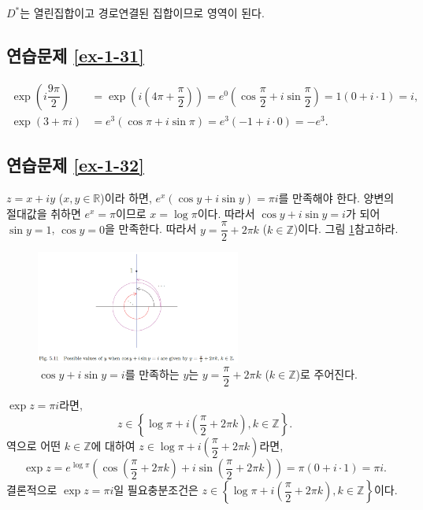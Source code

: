 $D^*$는 열린집합이고 경로연결된 집합이므로 영역이 된다.

\subsection*{연습문제 \ref{ex-1-31}}

\begin{align*}
\exp\left(i\dfrac{9\pi}2\right) 
&= \exp\left(i\left(4\pi + \dfrac{\pi}2\right) \right)
= e^0 \left( \cos\dfrac\pi2 + i\sin\dfrac\pi2 \right) 
= 1(0+i\cdot 1) = i, \\
\exp(3+\pi i) &= e^3(\cos \pi + i\sin \pi) = e^3(-1+i\cdot 0) = -e^3.
\end{align*}

\subsection*{연습문제 \ref{ex-1-32}}

$z=x+iy$ ($x,y\in\mathbb R$)이라 하면,
$e^x(\cos y + i\sin y) = \pi i$를 만족해야 한다.
양변의 절대값을 취하면 $e^x = \pi$이므로
$x=\log \pi$이다.
따라서 $\cos y + i\sin y = i$가 되어
$\sin y = 1$, $\cos y=0$을 만족한다.
따라서 $y = \dfrac\pi2 + 2\pi k$ ($k\in \mathbb Z$)이다.
그림 \ref{fig-5-11}\을 참고하라.

\begin{figure}[h!]
\begin{center}
\includegraphics[width=0.6\textwidth]{./Solution/figs/fig-5-11}
\end{center}
\caption{$\cos y + i\sin y = i$를 만족하는 $y$는
$y = \dfrac\pi2 + 2\pi k$ ($k\in \mathbb Z$)로 주어진다.
}
\label{fig-5-11}
\end{figure}

$\exp z = \pi i$라면,
\[
z\in \left\{ \log \pi + i \left(\dfrac\pi 2 + 2\pi k\right), k\in\mathbb Z\right\}.
\]
역으로 어떤 $k\in\mathbb Z$에 대하여
$z\in \log \pi + i \left(\dfrac\pi 2 + 2\pi k\right)$라면,
\[
\exp z = e^{\log \pi} \left(
\cos\left(\dfrac\pi2+2\pi k\right) + i \sin\left(\dfrac\pi2+2\pi k\right)
\right) = \pi(0+i\cdot 1) = \pi i.
\]
결론적으로 $\exp z = \pi i$일 필요충분조건은
$z\in \left\{ \log \pi + i \left(\dfrac\pi 2 + 2\pi k\right), k\in\mathbb Z\right\}$이다.

